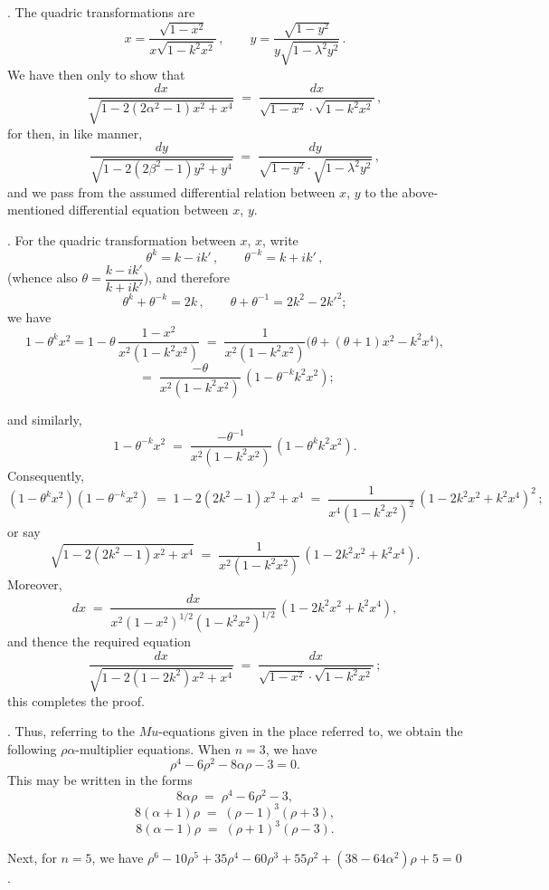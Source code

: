 \documentclass[11pt]{article}
\begin{document}
\medskip

. The quadric transformations are
\[
x = \frac{\sqrt{1-x^2}}{x\sqrt{1-k^2 x^2}}\,,\qquad y = \frac{\sqrt{1-y^2}}{y\sqrt{1-\lambda^2 y^2}}\,.
\]
We have then only to show that
\[
\frac{dx}{\sqrt{1 - 2(2\alpha^2 - 1)x^2 + x^4}} \;=\; \frac{dx}{\sqrt{1-x^2}\cdot\sqrt{1-k^2 x^2}}\,,
\]
for then, in like manner,
\[
\frac{dy}{\sqrt{1 - 2(2\beta^2 - 1)y^2 + y^4}} \;=\; \frac{dy}{\sqrt{1-y^2}\cdot\sqrt{1-\lambda^2 y^2}}\,,
\]
and we pass from the assumed differential relation between $x$, $y$ to the above-mentioned differential equation between $x$, $y$.

\medskip

. For the quadric transformation between $x$, $x$, write
\[
\theta^k = k - ik'\,,\qquad \theta^{-k} = k + ik'\,,
\]
\Big(whence also $\theta = \dfrac{k-ik'}{k+ik'}$\Big), and therefore
\[
\theta^k + \theta^{-k} = 2k\,,\qquad \theta + \theta^{-1} = 2k^2 - 2k'^2;
\]
we have
\[
1 - \theta^k x^2 = 1 - \theta\,\frac{1 - x^2}{x^2(1 - k^2 x^2)} \;=\; \frac{1}{x^2(1 - k^2 x^2)}\bigl(\theta + (\theta+1)x^2 - k^2 x^4\bigr),
\]
\[
\;=\; \frac{-\theta}{x^2(1 - k^2 x^2)}\,(1 - \theta^{-k} k^2 x^2);
\]

\newpage

\noindent and similarly,
\[
1 - \theta^{-k} x^2 \;=\; \frac{-\theta^{-1}}{x^2(1 - k^2 x^2)}\,(1 - \theta^k k^2 x^2).
\]
Consequently,
\[
(1 - \theta^k x^2)(1 - \theta^{-k} x^2) \;=\; 1 - 2(2k^2 - 1)x^2 + x^4 \;=\; \frac{1}{x^4(1 - k^2 x^2)^2}\,(1 - 2k^2 x^2 + k^2 x^4)^2\,;
\]
or say
\[
\sqrt{1 - 2(2k^2 - 1)x^2 + x^4} \;=\; \frac{1}{x^2(1 - k^2 x^2)}\,(1 - 2k^2 x^2 + k^2 x^4).
\]
Moreover,
\[
dx \;=\; \frac{dx}{x^2(1-x^2)^{1/2}(1-k^2 x^2)^{1/2}}\,(1 - 2k^2 x^2 + k^2 x^4),
\]
and thence the required equation
\[
\frac{dx}{\sqrt{1 - 2(1 - 2k^2)x^2 + x^4}} \;=\; \frac{dx}{\sqrt{1-x^2}\cdot\sqrt{1-k^2 x^2}}\,;
\]
this completes the proof.

\medskip

. Thus, referring to the $Mu$-equations given in the place referred to, we obtain the following $\rho\alpha$-multiplier equations. When $n=3$, we have
\[
\rho^4 - 6\rho^2 - 8\alpha\rho - 3 = 0.
\]
This may be written in the forms
\[
8\alpha\rho \;=\; \rho^4 - 6\rho^2 - 3,
\]
\[
8(\alpha+1)\rho \;=\; (\rho-1)^3(\rho+3),
\]
\[
8(\alpha-1)\rho \;=\; (\rho+1)^3(\rho-3).
\]

\noindent Next, for $n=5$, we have $\rho^6 - 10\rho^5 + 35\rho^4 - 60\rho^3 + 55\rho^2 + (38 - 64\alpha^2)\rho + 5 = 0$.
\end{document}
